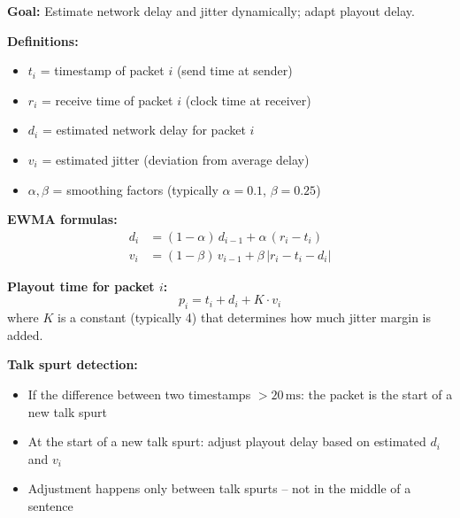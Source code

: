 \begin{tcolorbox}[formulabox, title=Adaptive Playout Delay -- EWMA]
\textbf{Goal:} Estimate network delay and jitter dynamically; adapt playout delay.

\medskip
\textbf{Definitions:}
\begin{itemize}[nosep]
  \item $t_i$ = timestamp of packet $i$ (send time at sender)
  \item $r_i$ = receive time of packet $i$ (clock time at receiver)
  \item $d_i$ = estimated network delay for packet $i$
  \item $v_i$ = estimated jitter (deviation from average delay)
  \item $\alpha, \beta$ = smoothing factors (typically $\alpha = 0.1$, $\beta = 0.25$)
\end{itemize}

\medskip
\textbf{EWMA formulas:}
\begin{align}
  d_i &= (1 - \alpha)\,d_{i-1} + \alpha\,(r_i - t_i) \\
  v_i &= (1 - \beta)\,v_{i-1} + \beta\,|r_i - t_i - d_i|
\end{align}

\medskip
\textbf{Playout time for packet $i$:}
\[
  p_i = t_i + d_i + K \cdot v_i
\]
where $K$ is a constant (typically 4) that determines how much jitter margin is added.

\medskip
\textbf{Talk spurt detection:}
\begin{itemize}[nosep]
  \item If the difference between two timestamps $> 20\,\text{ms}$: the packet is the start of a new talk spurt
  \item At the start of a new talk spurt: adjust playout delay based on estimated $d_i$ and $v_i$
  \item Adjustment happens only between talk spurts -- not in the middle of a sentence
\end{itemize}
\end{tcolorbox}

\begin{imagebox}
\end{imagebox}

